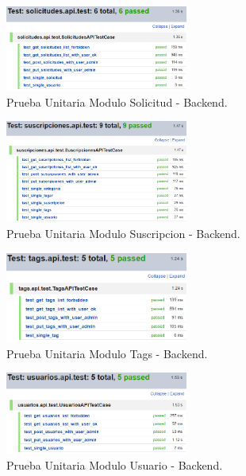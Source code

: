 \documentclass[12pt,letterpaper,openany]{book}
\begin{document}
\begin{figure}[H]
\begin{center}
\includegraphics[width=6cm]{./imagenes/Test/Backend/Test__solicitudes_api_test}
\caption{Prueba Unitaria Modulo Solicitud - Backend.}
\end{center}
\end{figure}

\begin{figure}[H]
\begin{center}
\includegraphics[width=6cm]{./imagenes/Test/Backend/Test__suscripciones_api_test}
\caption{Prueba Unitaria Modulo Suscripcion - Backend.}
\end{center}
\end{figure}

\begin{figure}[H]
\begin{center}
\includegraphics[width=6cm]{./imagenes/Test/Backend/Test__tags_api_test}
\caption{Prueba Unitaria Modulo Tags - Backend.}
\end{center}
\end{figure}

\begin{figure}[H]
\begin{center}
\includegraphics[width=6cm]{./imagenes/Test/Backend/Test__usuarios_api_test}
\caption{Prueba Unitaria Modulo Usuario - Backend.}
\end{center}
\end{figure}
\end{document}
